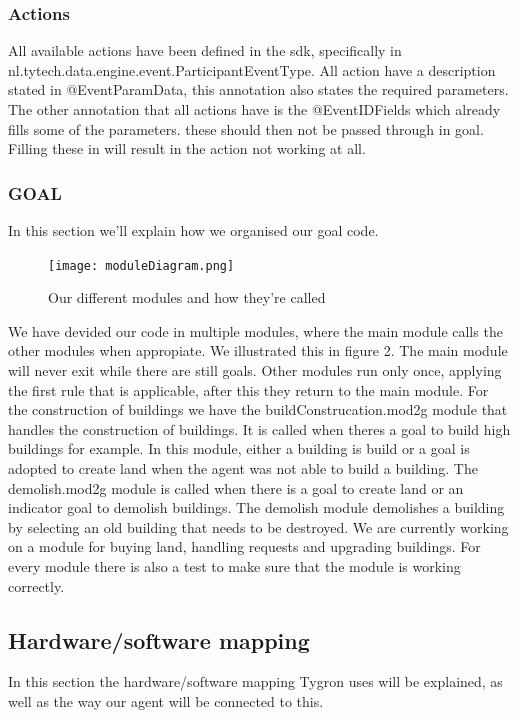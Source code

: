 \subsubsection{Actions}

All available actions have been defined in the sdk, specifically in \\nl.tytech.data.engine.event.ParticipantEventType. All action have a description stated in @EventParamData, this annotation also states the required parameters. The other annotation that all actions have is the @EventIDFields which already fills some of the parameters. these should then not be passed through in goal. Filling these in will result in the action not working at all.

\subsubsection{GOAL}

In this section we'll explain how we organised our goal code.
\begin{figure}[h!]
\texttt{[image: moduleDiagram.png]}
\caption{Our different modules and how they're called}
\label{fig:Modules}
\end{figure}
We have devided our code in multiple modules, where the main module calls the other modules when appropiate. We illustrated this in figure 2.
The main module will never exit while there are still goals. Other modules run only once, applying the first rule that is applicable, after this they return to the main module.
For the construction of buildings we have the buildConstrucation.mod2g module that handles the construction of buildings. It is called when theres a goal to build high buildings for example. In this module, either a building is build or a goal is adopted to create land when the agent was not able to build a building.
The demolish.mod2g module is called when there is a goal to create land or an indicator goal to demolish buildings. The demolish module demolishes a building by selecting an old building that needs to be destroyed. We are currently working on a module for buying land, handling requests and upgrading buildings.
For every module there is also a test to make sure that the module is working correctly.

\newpage
\subsection{Hardware/software mapping}
In this section the hardware/software mapping Tygron uses will be explained, as well as the way our agent will be connected to this.

